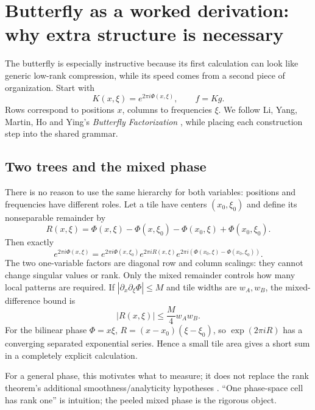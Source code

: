 \section{Butterfly as a worked derivation: why extra structure is necessary}
\label{sec:butterfly}

The butterfly is especially instructive because its first calculation can look like generic low-rank compression, while its speed comes from a second piece of organization. Start with
\begin{equation}
 K(x,\xi)=e^{2\pi i\Phi(x,\xi)},\qquad f=Kg.
 \label{eq:fiokernel}
\end{equation}
Rows correspond to positions $x$, columns to frequencies $\xi$. We follow Li, Yang, Martin, Ho and Ying's \emph{Butterfly Factorization} \cite{li2015butterfly}, while placing each construction step into the shared grammar.

\subsection{Two trees and the mixed phase}
There is no reason to use the same hierarchy for both variables: positions and frequencies have different roles. Let a tile have centers $(x_0,\xi_0)$ and define its nonseparable remainder by
\[
R(x,\xi)=\Phi(x,\xi)-\Phi(x,\xi_0)-\Phi(x_0,\xi)+\Phi(x_0,\xi_0).
\]
Then exactly
\begin{equation}
 e^{2\pi i\Phi(x,\xi)}
 =e^{2\pi i\Phi(x,\xi_0)}e^{2\pi iR(x,\xi)}
 e^{2\pi i(\Phi(x_0,\xi)-\Phi(x_0,\xi_0))}.
 \label{eq:phasepeel}
\end{equation}
The two one-variable factors are diagonal row and column scalings: they cannot change singular values or rank. Only the mixed remainder controls how many local patterns are required. If $\left|\partial_x\partial_\xi\Phi\right|\leq M$ and tile widths are $w_A,w_B$, the mixed-difference bound is
\begin{equation}
 |R(x,\xi)|\leq \frac{M}{4}w_Aw_B.
 \label{eq:phasebound}
\end{equation}
For the bilinear phase $\Phi=x\xi$, $R=(x-x_0)(\xi-\xi_0)$, so $\exp(2\pi iR)$ has a converging separated exponential series. Hence a small tile area gives a short sum in a completely explicit calculation.

For a general phase, this motivates what to measure; it does not replace the rank theorem's additional smoothness/analyticity hypotheses \cite{candes2009butterfly}. ``One phase-space cell has rank one'' is intuition; the peeled mixed phase is the rigorous object.

